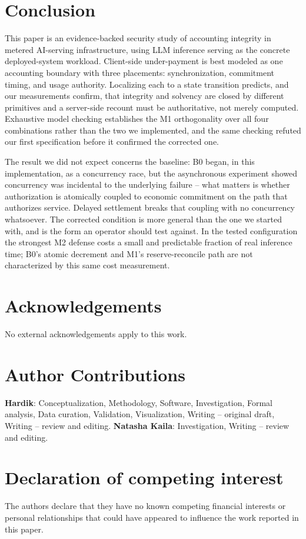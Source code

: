 \documentclass[manuscript,review]{acmart}
\begin{document}
\section{Conclusion}
This paper is an evidence-backed security study of accounting integrity in metered
AI-serving infrastructure, using LLM inference serving as the concrete deployed-system
workload. Client-side under-payment
is best modeled as one accounting boundary with three placements: synchronization,
commitment timing, and usage authority. Localizing each to a state transition predicts,
and our measurements confirm, that integrity and solvency are closed by different
primitives and a server-side recount must be authoritative, not merely computed.
Exhaustive model checking establishes
the M1 orthogonality over all four combinations rather than the two we implemented, and
the same checking refuted our first specification before it confirmed the corrected one.

The result we did not expect concerns the baseline: B0 began, in this implementation, as
a concurrency race, but the asynchronous experiment showed concurrency was incidental to
the underlying failure -- what matters is whether authorization is atomically coupled to
economic commitment on the path that authorizes service. Delayed settlement breaks that
coupling with no concurrency whatsoever. The corrected condition is more general than the
one we started with, and is the form an operator should test against. In the tested configuration the strongest M2 defense costs a small and
predictable fraction of real inference time; B0's atomic decrement and M1's
reserve-reconcile path are not characterized by this same cost measurement.

\section*{Acknowledgements}
No external acknowledgements apply to this work.

\section*{Author Contributions}
\textbf{Hardik}: Conceptualization, Methodology, Software, Investigation, Formal
analysis, Data curation, Validation, Visualization, Writing -- original draft, Writing --
review and editing. \textbf{Natasha Kaila}: Investigation, Writing -- review and editing.

\section*{Declaration of competing interest}
The authors declare that they have no known competing financial interests or personal
relationships that could have appeared to influence the work reported in this paper.
\end{document}
